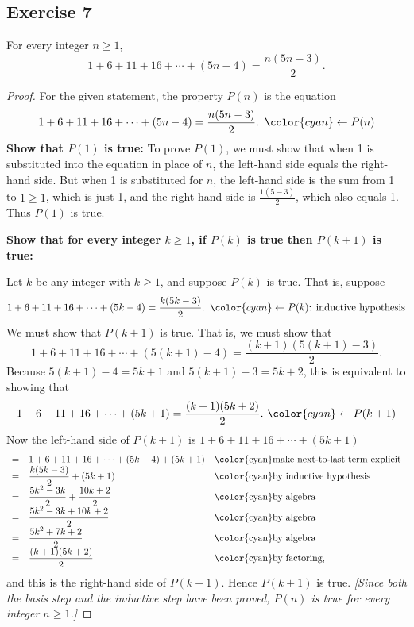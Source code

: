 \documentclass[14pt]{extarticle}
\newcommand{\dps}{\displaystyle}
\newcommand{\from}{\leftarrow}
\newcommand{\cy}{\color{cyan}}
\begin{document}
\subsection{Exercise 7}
For every integer $n \geq 1$,
\[
    1 + 6 + 11 + 16 + \cdots + (5n-4) = \frac{n(5n-3)}{2}.
\]
\begin{proof}
    For the given statement, the property $P(n)$ is the equation
    \[
        1 + 6 + 11 + 16 + \cdots + (5n-4) = \frac{n(5n-3)}{2}. \,\,\, {\cy \from P(n)}
    \]
    {\bf Show that $P(1)$ is true:} To prove $P(1)$, we must show that when 1 is substituted into the equation in place of $n$, the left-hand side equals the right-hand side. But when 1 is substituted for $n$, the left-hand side is the sum from 1 to $1 \geq 1$, which is just 1, and the right-hand side is $\frac{1(5-3)}{2}$, which also equals 1. Thus $P(1)$ is true.

        {\bf Show that for every integer $k \geq 1$, if $P(k)$ is true then $P(k + 1)$ is true:}

    Let $k$ be any integer with $k \geq 1$, and suppose $P(k)$ is true. That is, suppose
    \[
        1 + 6 + 11 + 16 + \cdots + (5k-4) = \frac{k(5k-3)}{2}. \,\,\, {\cy \from P(k) \text{: inductive hypothesis}}
    \]
    We must show that $P(k + 1)$ is true. That is, we must show that
    \[
        1 + 6 + 11 + 16 + \cdots + (5(k+1)-4) = \frac{(k+1)(5(k+1)-3)}{2}.
    \]
    Because $5(k + 1) - 4 = 5k+1$ and $5(k + 1) - 3 = 5k+2$, this is equivalent to showing that
    \[
        1 + 6 + 11 + 16 + \cdots + (5k+1) = \frac{(k+1)(5k+2)}{2}. \,\, {\cy \from P(k + 1)}
    \]
    Now the left-hand side of $P(k + 1)$ is $1 + 6 + 11 + 16 + \cdots + (5k+1)$
    \[
        \begin{array}{lll}
            = & \dps 1 + 6 + 11 + 16 + \cdots + (5k-4) + (5k+1) & \text{\cy make next-to-last term explicit} \\
            = & \dps \frac{k(5k-3)}{2} + (5k+1)                 & \text{\cy by inductive hypothesis}         \\
            = & \dps \frac{5k^2-3k}{2} + \frac{10k+2}{2}        & \text{\cy by algebra}                      \\
            = & \dps \frac{5k^2-3k + 10k + 2}{2}                & \text{\cy by algebra}                      \\
            = & \dps \frac{5k^2 + 7k + 2}{2}                    & \text{\cy by algebra}                      \\
            = & \dps \frac{(k+1)(5k+2)}{2}                      & \text{\cy by factoring,}
        \end{array}
    \]
    and this is the right-hand side of $P(k + 1)$. Hence $P(k + 1)$ is true. {\it [Since both the basis step and the inductive step have been proved, $P(n)$ is true for every integer $n \geq 1$.]}
\end{proof}
\end{document}
